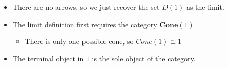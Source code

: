 \begin{itemize}
    \item  There are no arrows, so we just recover the set $D(1)$ as the limit.
    \item The limit definition first requires the \href{doc/1 math/Seven Sketches in Compositionality/Chapter 3: Databases/5 Introduction to limits and colimits/2 Limits/4 Cone}{category} $\mathbf{Cone}(1)$
          \begin{itemize}
            \item There is only one possible cone, so $Cone(1)\cong 1$
          \end{itemize}
    \item The terminal object in $1$ is the sole object of the category.
  \end{itemize}
